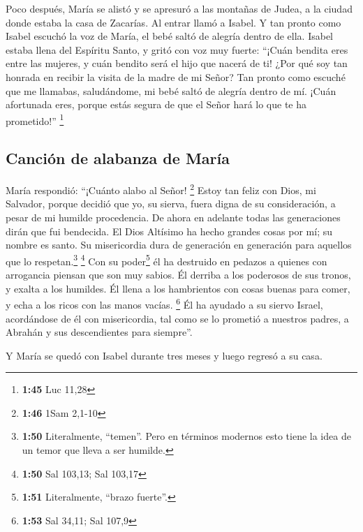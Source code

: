  Poco después, María se alistó y se apresuró a las
montañas de Judea, a la ciudad donde  estaba la casa de
Zacarías. Al entrar llamó a Isabel.  Y tan pronto como
Isabel escuchó la voz de María, el bebé saltó de alegría dentro de ella.
Isabel estaba llena del Espíritu Santo,  y gritó con voz
muy fuerte: ``¡Cuán bendita eres entre las mujeres, y cuán bendito será
el hijo que nacerá de ti!  ¿Por qué soy tan honrada en
recibir la visita de la madre de mi Señor?  Tan pronto
como escuché que me llamabas, saludándome, mi bebé saltó de alegría
dentro de mí.  ¡Cuán afortunada eres, porque estás segura
de que el Señor hará lo que te ha prometido!'' \footnote{\textbf{1:45}
  Luc 11,28}

\hypertarget{canciuxf3n-de-alabanza-de-maruxeda}{%
\subsection{Canción de alabanza de
María}\label{canciuxf3n-de-alabanza-de-maruxeda}}

 María respondió: ``¡Cuánto alabo al Señor! \footnote{\textbf{1:46}
  1Sam 2,1-10}  Estoy tan feliz con Dios, mi Salvador,
 porque decidió que yo, su sierva, fuera digna de su
consideración, a pesar de mi humilde procedencia. De ahora en adelante
todas las generaciones dirán que fui bendecida.  El Dios
Altísimo ha hecho grandes cosas por mí; su nombre es santo.
 Su misericordia dura de generación en generación para
aquellos que lo respetan.\footnote{\textbf{1:50} Literalmente,
  ``temen''. Pero en términos modernos esto tiene la idea de un temor
  que lleva a ser humilde.} \footnote{\textbf{1:50} Sal 103,13; Sal
  103,17}  Con su poder\footnote{\textbf{1:51}
  Literalmente, ``brazo fuerte''.} él ha destruido en pedazos a quienes
con arrogancia piensan que son muy sabios.  Él derriba a
los poderosos de sus tronos, y exalta a los humildes.  Él
llena a los hambrientos con cosas buenas para comer, y echa a los ricos
con las manos vacías. \footnote{\textbf{1:53} Sal 34,11; Sal 107,9}
 Él ha ayudado a su siervo Israel, acordándose de él con
misericordia,  tal como se lo prometió a nuestros padres,
a Abrahán y sus descendientes para siempre''.

 Y María se quedó con Isabel durante tres meses y luego
regresó a su casa.

